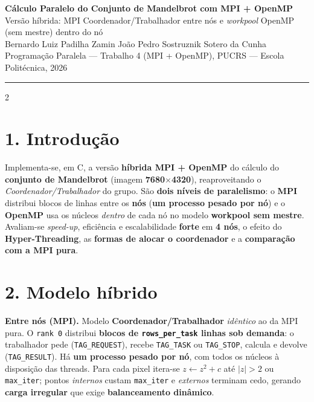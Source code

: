 \documentclass[10pt,a4paper]{article}
\begin{document}
\begin{center}
  {\Large\bfseries Cálculo Paralelo do Conjunto de Mandelbrot com MPI + OpenMP}\\[3pt]
  {\large Versão híbrida: MPI Coordenador/Trabalhador entre nós e \emph{workpool} OpenMP (sem mestre) dentro do nó}\\[6pt]
  Bernardo Luiz Padilha Zamin \quad\textbullet\quad João Pedro Sostruznik Sotero da Cunha\\[2pt]
  {\small Programação Paralela --- Trabalho 4 (MPI + OpenMP), PUCRS --- Escola Politécnica, 2026}
\end{center}
\vspace{2pt}\hrule\vspace{8pt}

\begin{multicols}{2}

\section*{1. Introdução}
Implementa-se, em C, a versão \textbf{híbrida MPI + OpenMP} do cálculo do \textbf{conjunto de Mandelbrot} (imagem \textbf{7680$\times$4320}), reaproveitando o \emph{Coordenador/Trabalhador} do grupo. São \textbf{dois níveis de paralelismo}: o \textbf{MPI} distribui blocos de linhas entre os \textbf{nós} (\textbf{um processo pesado por nó}) e o \textbf{OpenMP} usa os núcleos \emph{dentro} de cada nó no modelo \textbf{workpool sem mestre}. Avaliam-se \emph{speed-up}, eficiência e escalabilidade \textbf{forte} em \textbf{4 nós}, o efeito do \textbf{Hyper-Threading}, as \textbf{formas de alocar o coordenador} e a \textbf{comparação com a MPI pura}.

\section*{2. Modelo híbrido}
\textbf{Entre nós (MPI).} Modelo \textbf{Coordenador/Trabalhador} \emph{idêntico} ao da MPI pura. O \texttt{rank 0} distribui \textbf{blocos de \texttt{rows\_per\_task} linhas sob demanda}: o trabalhador pede (\texttt{TAG\_REQUEST}), recebe \texttt{TAG\_TASK} ou \texttt{TAG\_STOP}, calcula e devolve (\texttt{TAG\_RESULT}). Há \textbf{um processo pesado por nó}, com todos os núcleos à disposição das threads. Para cada pixel itera-se $z\leftarrow z^2+c$ até $|z|>2$ ou \texttt{max\_iter}; pontos \emph{internos} custam \texttt{max\_iter} e \emph{externos} terminam cedo, gerando \textbf{carga irregular} que exige \textbf{balanceamento dinâmico}.


\end{multicols}
\end{document}
